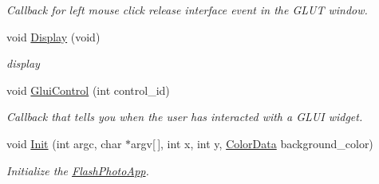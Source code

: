 \begin{DoxyCompactItemize}
\begin{DoxyCompactList}\small\item\em Callback for left mouse click release interface event in the G\+L\+UT window. \end{DoxyCompactList}\item 
void \hyperlink{classimage__tools_1_1FlashPhotoApp_a3ee0b08c0e7096652ef8dc549a684f76}{Display} (void)\hypertarget{classimage__tools_1_1FlashPhotoApp_a3ee0b08c0e7096652ef8dc549a684f76}{}\label{classimage__tools_1_1FlashPhotoApp_a3ee0b08c0e7096652ef8dc549a684f76}

\begin{DoxyCompactList}\small\item\em display \end{DoxyCompactList}\item 
void \hyperlink{classimage__tools_1_1FlashPhotoApp_a1cfe5fd1baf32a23264a6eff88987baf}{Glui\+Control} (int control\+\_\+id)\hypertarget{classimage__tools_1_1FlashPhotoApp_a1cfe5fd1baf32a23264a6eff88987baf}{}\label{classimage__tools_1_1FlashPhotoApp_a1cfe5fd1baf32a23264a6eff88987baf}

\begin{DoxyCompactList}\small\item\em Callback that tells you when the user has interacted with a G\+L\+UI widget. \end{DoxyCompactList}\item 
void \hyperlink{classimage__tools_1_1FlashPhotoApp_a1bf24fa1a123732fe5d5e1964974dec1}{Init} (int argc, char $\ast$argv\mbox{[}$\,$\mbox{]}, int x, int y, \hyperlink{classimage__tools_1_1ColorData}{Color\+Data} background\+\_\+color)
\begin{DoxyCompactList}\small\item\em Initialize the \hyperlink{classimage__tools_1_1FlashPhotoApp}{Flash\+Photo\+App}. \end{DoxyCompactList}\end{DoxyCompactItemize}
